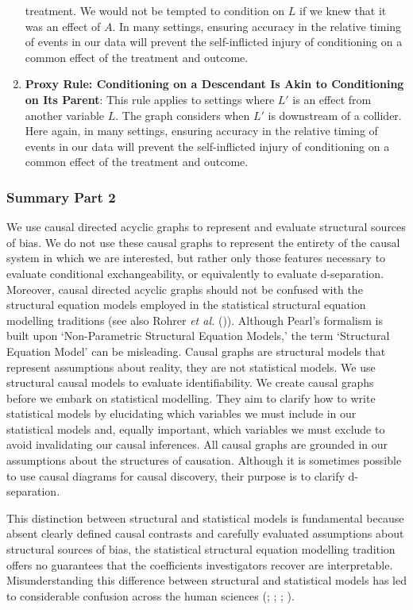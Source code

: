 \documentclass[
  single column]{article}
\begin{document}
\begin{enumerate}
  treatment. We would not be tempted to condition on \(L\) if we knew
  that it was an effect of \(A\). In many settings, ensuring accuracy in
  the relative timing of events in our data will prevent the
  self-inflicted injury of conditioning on a common effect of the
  treatment and outcome.
\item
  \textbf{Proxy Rule: Conditioning on a Descendant Is Akin to
  Conditioning on Its Parent}: This rule applies to settings where
  \(L'\) is an effect from another variable \(L\). The graph considers
  when \(L'\) is downstream of a collider. Here again, in many settings,
  ensuring accuracy in the relative timing of events in our data will
  prevent the self-inflicted injury of conditioning on a common effect
  of the treatment and outcome.
\end{enumerate}

\subsubsection{Summary Part 2}\label{summary-part-2}

We use causal directed acyclic graphs to represent and evaluate
structural sources of bias. We do not use these causal graphs to
represent the entirety of the causal system in which we are interested,
but rather only those features necessary to evaluate conditional
exchangeability, or equivalently to evaluate d-separation. Moreover,
causal directed acyclic graphs should not be confused with the
structural equation models employed in the statistical structural
equation modelling traditions (see also Rohrer \emph{et al.}
()). Although Pearl's formalism is
built upon `Non-Parametric Structural Equation Models,' the term
`Structural Equation Model' can be misleading. Causal graphs are
structural models that represent assumptions about reality, they are not
statistical models. We use structural causal models to evaluate
identifiability. We create causal graphs before we embark on statistical
modelling. They aim to clarify how to write statistical models by
elucidating which variables we must include in our statistical models
and, equally important, which variables we must exclude to avoid
invalidating our causal inferences. All causal graphs are grounded in
our assumptions about the structures of causation. Although it is
sometimes possible to use causal diagrams for causal discovery, their
purpose is to clarify d-separation.

This distinction between structural and statistical models is
fundamental because absent clearly defined causal contrasts and
carefully evaluated assumptions about structural sources of bias, the
statistical structural equation modelling tradition offers no guarantees
that the coefficients investigators recover are interpretable.
Misunderstanding this difference between structural and statistical
models has led to considerable confusion across the human sciences
(;
;
;
).
\end{document}
